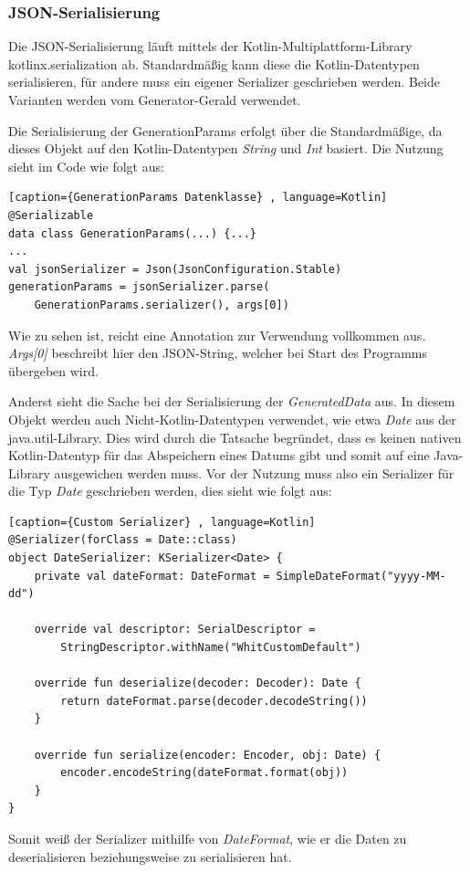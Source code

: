 \subsubsection{JSON-Serialisierung}
Die JSON-Serialisierung läuft mittels der Kotlin-Multiplattform-Library kotlinx.serialization ab. Standardmäßig kann diese die Kotlin-Datentypen serialisieren, für andere muss ein eigener Serializer geschrieben werden. Beide Varianten werden vom Generator-Gerald verwendet.
\vspace{4mm}\par
Die Serialisierung der GenerationParams erfolgt über die Standardmäßige, da dieses Objekt auf den Kotlin-Datentypen  \textit{String} und  \textit{Int} basiert. Die Nutzung sieht im Code wie folgt aus:
\begin{lstlisting}[caption={GenerationParams Datenklasse} , language=Kotlin]
@Serializable
data class GenerationParams(...) {...}
...
val jsonSerializer = Json(JsonConfiguration.Stable)
generationParams = jsonSerializer.parse(
    GenerationParams.serializer(), args[0])
\end{lstlisting}
\vspace{4mm}\par
Wie zu sehen ist, reicht eine Annotation zur Verwendung vollkommen aus. \textit{Args[0]} beschreibt hier den JSON-String, welcher bei Start des Programms übergeben wird.
\vspace{4mm}\par
\newpage
Anderst sieht die Sache bei der Serialisierung der \textit{GeneratedData} aus. In diesem Objekt werden auch Nicht-Kotlin-Datentypen verwendet, wie etwa \textit{Date} aus der java.util-Library. Dies wird durch die Tatsache begründet, dass es keinen nativen Kotlin-Datentyp für das Abspeichern eines Datums gibt und somit auf eine Java-Library ausgewichen werden muss. Vor der Nutzung muss also ein Serializer für die Typ \textit{Date} geschrieben werden, dies sieht wie folgt aus:
\begin{lstlisting}[caption={Custom Serializer} , language=Kotlin]
@Serializer(forClass = Date::class)
object DateSerializer: KSerializer<Date> {
    private val dateFormat: DateFormat = SimpleDateFormat("yyyy-MM-dd")

    override val descriptor: SerialDescriptor =
        StringDescriptor.withName("WhitCustomDefault")

    override fun deserialize(decoder: Decoder): Date {
        return dateFormat.parse(decoder.decodeString())
    }

    override fun serialize(encoder: Encoder, obj: Date) {
        encoder.encodeString(dateFormat.format(obj))
    }
}
\end{lstlisting}
\vspace{4mm}\par
Somit weiß der Serializer mithilfe von  \textit{DateFormat}, wie er die Daten zu deserialisieren beziehungsweise zu serialisieren hat.

